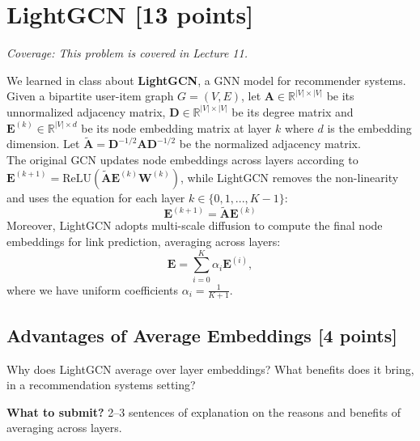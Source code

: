 \section{LightGCN [13 points]}
\noindent\textit{Coverage: This problem is covered in Lecture 11.}

We learned in class about \textbf{LightGCN}, a GNN model for recommender systems. Given a bipartite user-item graph $G = (V, E)$, let $\mathbf{A} \in \mathbb{R}^{|V| \times |V|}$ be its unnormalized adjacency matrix, $\mathbf{D} \in \mathbb{R}^{|V| \times |V|}$ be its degree matrix and $\mathbf{E}^{(k)} \in \mathbb{R}^{|V| \times d}$ be its node embedding matrix at layer $k$ where $d$ is the embedding dimension. Let $\tilde{\mathbf{A}} = \mathbf{D}^{-1/2} \mathbf{A} \mathbf{D}^{-1/2}$ be the normalized adjacency matrix.\\

\noindent The original GCN updates node embeddings across layers according to $\mathbf{E}^{(k+1)} = \text{ReLU}(\tilde{\mathbf{A}} \mathbf{E}^{(k)} \mathbf{W}^{(k)})$, while LightGCN removes the non-linearity and uses the equation for each layer $k\in \{0, 1, ..., K-1\}$:
\begin{equation}
    \mathbf{E}^{(k+1)} = \tilde{\mathbf{A}} \mathbf{E}^{(k)}
\end{equation}
Moreover, LightGCN adopts multi-scale diffusion to compute the final node embeddings for link prediction, averaging across layers:
\begin{equation}\label{eq:lightgcn-diff}
    \mathbf{E} = \sum_{i=0}^{K} \alpha_{i} \mathbf{E}^{(i)},
\end{equation}
where we have uniform coefficients $\alpha_{i} = \frac{1}{K + 1}$.


\subsection{Advantages of Average Embeddings [4 points]}
    Why does LightGCN average over layer embeddings? What benefits does it bring, in a recommendation systems setting?

    \textbf{What to submit?} 2--3 sentences of explanation on the reasons and benefits of averaging across layers.

\Solution{}

